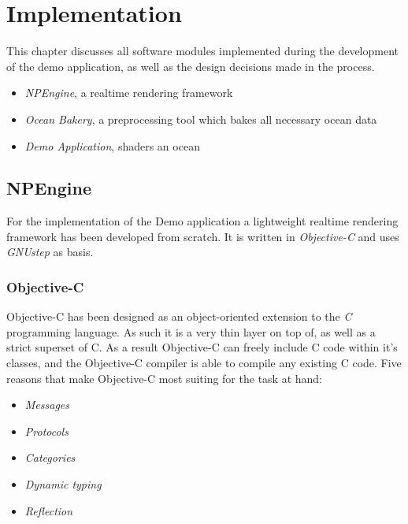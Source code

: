 \chapter{Implementation}

This chapter discusses all software modules implemented during the
development of the demo application, as well as the design decisions made in
the process.

\begin{itemize}
 \item \textit{NPEngine}, a realtime rendering framework
 \item \textit{Ocean Bakery}, a preprocessing tool which bakes all
necessary ocean data
 \item \textit{Demo Application}, shaders an ocean
\end{itemize}

\section{NPEngine}

For the implementation of the Demo application a lightweight realtime
rendering framework has been developed from scratch. It is written in
\textit{Objective-C} and uses \textit{GNUstep} as basis.

\subsection{Objective-C}

Objective-C has been designed as an object-oriented extension to the
\textit{C} programming language. As such it is a very thin layer on top of, as
well as a strict superset of C. As a result Objective-C can freely include C
code within it's classes, and the Objective-C compiler is able to compile any
existing C code. 
Five reasons that make Objective-C most suiting for the task at hand:

\begin{itemize}
 \item \textit{Messages}
 \item \textit{Protocols}
 \item \textit{Categories}
 \item \textit{Dynamic typing}
 \item \textit{Reflection}
\end{itemize}

